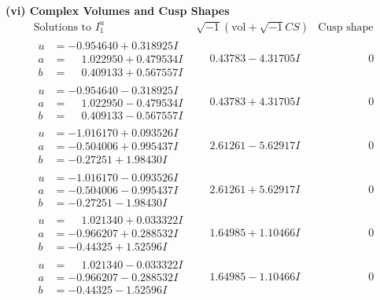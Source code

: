 \documentclass[1p]{elsarticle_modified}
\theoremstyle{definition}
\newcommand{\I}{\sqrt{-1}}
\begin{document}
\newpage\flushleft \textbf{(vi) Complex Volumes and Cusp Shapes}
$$\begin{array}{c|c|c}  
\text{Solutions to }I^u_{1}& \I (\text{vol} + \sqrt{-1}CS) & \text{Cusp shape}\\
 \hline 
\begin{aligned}
u &= -0.954640 + 0.318925 I \\
a &= \phantom{-}1.022950 + 0.479534 I \\
b &= \phantom{-}0.409133 + 0.567557 I\end{aligned}
 & \phantom{-}0.43783 - 4.31705 I & \phantom{-0.000000 } 0 \\ \hline\begin{aligned}
u &= -0.954640 - 0.318925 I \\
a &= \phantom{-}1.022950 - 0.479534 I \\
b &= \phantom{-}0.409133 - 0.567557 I\end{aligned}
 & \phantom{-}0.43783 + 4.31705 I & \phantom{-0.000000 } 0 \\ \hline\begin{aligned}
u &= -1.016170 + 0.093526 I \\
a &= -0.504006 + 0.995437 I \\
b &= -0.27251 + 1.98430 I\end{aligned}
 & \phantom{-}2.61261 - 5.62917 I & \phantom{-0.000000 } 0 \\ \hline\begin{aligned}
u &= -1.016170 - 0.093526 I \\
a &= -0.504006 - 0.995437 I \\
b &= -0.27251 - 1.98430 I\end{aligned}
 & \phantom{-}2.61261 + 5.62917 I & \phantom{-0.000000 } 0 \\ \hline\begin{aligned}
u &= \phantom{-}1.021340 + 0.033322 I \\
a &= -0.966207 + 0.288532 I \\
b &= -0.44325 + 1.52596 I\end{aligned}
 & \phantom{-}1.64985 + 1.10466 I & \phantom{-0.000000 } 0 \\ \hline\begin{aligned}
u &= \phantom{-}1.021340 - 0.033322 I \\
a &= -0.966207 - 0.288532 I \\
b &= -0.44325 - 1.52596 I\end{aligned}
 & \phantom{-}1.64985 - 1.10466 I & \phantom{-0.000000 } 0 \\ \hline\begin{aligned}

\end{aligned}
\end{array}$$
\end{document}
